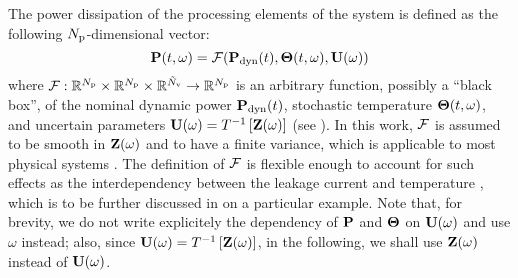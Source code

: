 The power dissipation of the processing elements of the system is defined as the following ${N_\text{p}}$-dimensional vector:
\begin{equation} \elabel{power-model}
  \vP(\t, \o) = \f(\vP_\dyn(\t), \vTO(\t, \o), \vU(\o))
\end{equation}
where $\mathcal{F}: \mathbb{R}^{N_\text{p}} \times \mathbb{R}^{N_\text{p}} \times \mathbb{R}^{\tilde{N}_\text{v}} \to \mathbb{R}^{N_\text{p}}$ is an arbitrary function, possibly a ``black box'', of the nominal dynamic power $\mathbf{P}_{\text{dyn}}(t)$, stochastic temperature ${\boldsymbol\Theta}(t, \omega)$, and uncertain parameters $\mathbf{U}(\omega) = T^{-1}\left[\mathbf{Z}(\omega)\right]$ (see ). In this work, $\mathcal{F}$ is assumed to be smooth in $\mathbf{Z}(\omega)$ and to have a finite variance, which is applicable to most physical systems \cite{xiu2002}. The definition of $\mathcal{F}$ is flexible enough to account for such effects as the interdependency between the leakage current and temperature \cite{srivastava2010, liu2007}, which is to be further discussed in  on a particular example. Note that, for brevity, we do not write explicitely the dependency of $\mathbf{P}$ and ${\boldsymbol\Theta}$ on $\mathbf{U}(\omega)$ and use $\omega$ instead; also, since $\mathbf{U}(\omega) = T^{-1}\left[\mathbf{Z}(\omega)\right]$, in the following, we shall use $\mathbf{Z}(\omega)$ instead of $\mathbf{U}(\omega)$.
